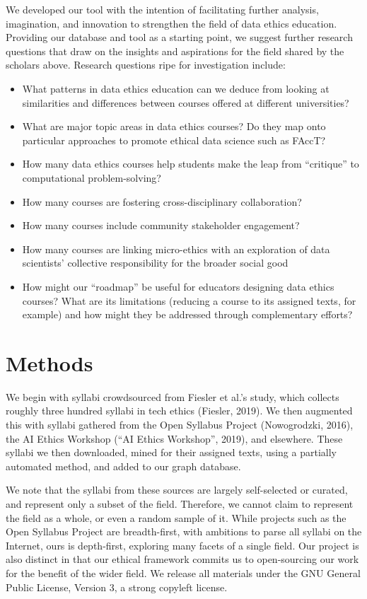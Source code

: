 \documentclass[
]{article}
\providecommand{\tightlist}{%
  \setlength{\itemsep}{0pt}\setlength{\parskip}{0pt}}
\begin{document}
We developed our tool with the intention of facilitating further
analysis, imagination, and innovation to strengthen the field of data
ethics education. Providing our database and tool as a starting point,
we suggest further research questions that draw on the insights and
aspirations for the field shared by the scholars above. Research
questions ripe for investigation include:

\begin{itemize}
\tightlist
\item
  What patterns in data ethics education can we deduce from looking at
  similarities and differences between courses offered at different
  universities?
\item
  What are major topic areas in data ethics courses? Do they map onto
  particular approaches to promote ethical data science such as FAccT?
\item
  How many data ethics courses help students make the leap from
  ``critique'' to computational problem-solving?
\item
  How many courses are fostering cross-disciplinary collaboration?
\item
  How many courses include community stakeholder engagement?
\item
  How many courses are linking micro-ethics with an exploration of data
  scientists' collective responsibility for the broader social good
\item
  How might our ``roadmap'' be useful for educators designing data
  ethics courses? What are its limitations (reducing a course to its
  assigned texts, for example) and how might they be addressed through
  complementary efforts?
\end{itemize}

\hypertarget{methods}{%
\section{Methods}\label{methods}}

We begin with syllabi crowdsourced from Fiesler et al.'s study, which
collects roughly three hundred syllabi in tech ethics (Fiesler, 2019).
We then augmented this with syllabi gathered from the Open Syllabus
Project (Nowogrodzki, 2016), the AI Ethics Workshop ({``{AI} {Ethics}
{Workshop}''}, 2019), and elsewhere. These syllabi we then downloaded,
mined for their assigned texts, using a partially automated method, and
added to our graph database.

We note that the syllabi from these sources are largely self-selected or
curated, and represent only a subset of the field. Therefore, we cannot
claim to represent the field as a whole, or even a random sample of it.
While projects such as the Open Syllabus Project are breadth-first, with
ambitions to parse all syllabi on the Internet, ours is depth-first,
exploring many facets of a single field. Our project is also distinct in
that our ethical framework commits us to open-sourcing our work for the
benefit of the wider field. We release all materials under the GNU
General Public License, Version 3, a strong copyleft license.
\end{document}
